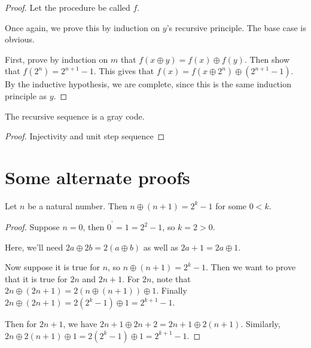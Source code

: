 \begin{proof}
    \leanok
    Let the procedure be called $f$.

    Once again, we prove this by induction on $y$'s recursive principle. The base case is obvious.

    First, prove by induction on $m$ that $f(x \oplus y) = f(x) \oplus f(y)$. Then show that
    $f(2^n) = 2^{n+1} - 1$. This gives that $f(x) = f(x \oplus 2^n) \oplus (2^{n+1} - 1)$.
    By the inductive hypothesis, we are complete, since this is the same induction principle as $y$.
\end{proof}

\begin{theorem}
    \label{thm:recursive_is_gray_code}
    The recursive sequence is a gray code.
    \leanok
\end{theorem}

\begin{proof}
    \leanok
    Injectivity and unit step sequence 
\end{proof}

\chapter{Some alternate proofs}

\begin{lemma}
    \label{thm:add_one_xor}
    \leanok
    Let $n$ be a natural number. Then $n \oplus (n+1) = 2^k - 1$ for some $0 < k$.
\end{lemma}

\begin{proof}
    \leanok
    Suppose $n = 0$, then $0 ^^^ 1 = 1 = 2^2 - 1$, so $k = 2 > 0$.

    Here, we'll need $2 a \oplus 2 b = 2 (a \oplus b)$ as well as
    $2 a + 1 = 2 a \oplus 1$.

    Now suppose it is true for $n$, so $n \oplus (n+1) = 2^k - 1$. Then we want to
    prove that it is true for $2 n$ and $2 n + 1$. For $2 n$, note that
    $2 n \oplus (2 n + 1) = 2 (n \oplus (n+1)) \oplus 1$. Finally
    $2n \oplus (2n + 1) = 2 (2^k - 1) \oplus 1 = 2^{k+1} - 1$.

    Then for $2n + 1$, we have $2 n + 1 \oplus 2n + 2 = 2 n + 1 \oplus 2 (n + 1)$. Similarly,
    $2 n \oplus 2 (n+1) \oplus 1 = 2 (2^k - 1) \oplus 1 = 2^{k+1} - 1$.
\end{proof}

